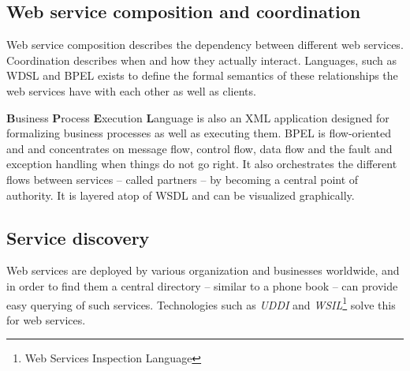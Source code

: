 \subsection{Web service composition and coordination}
Web service composition describes the dependency between different web services. Coordination describes when and how they actually interact. Languages, such as WDSL and BPEL exists to define the formal semantics of these relationships the web services have with each other as well as clients.

 \textbf{B}usiness \textbf{P}rocess \textbf{E}xecution \textbf{L}anguage is also an XML application designed for formalizing business processes as well as executing them. BPEL is flow-oriented and and concentrates on message flow, control flow, data flow and the fault and exception handling when things do not go right. It also orchestrates the different flows between services -- called partners -- by becoming a central point of authority. It is layered atop of WSDL and can be visualized graphically.



\subsection{Service discovery}
Web services are deployed by various organization and businesses worldwide, and in order to find them a central directory -- similar to a phone book -- can provide easy querying of such services. Technologies such as \emph{UDDI} and \emph{WSIL}\footnote{Web Services Inspection Language} solve this for web services.

